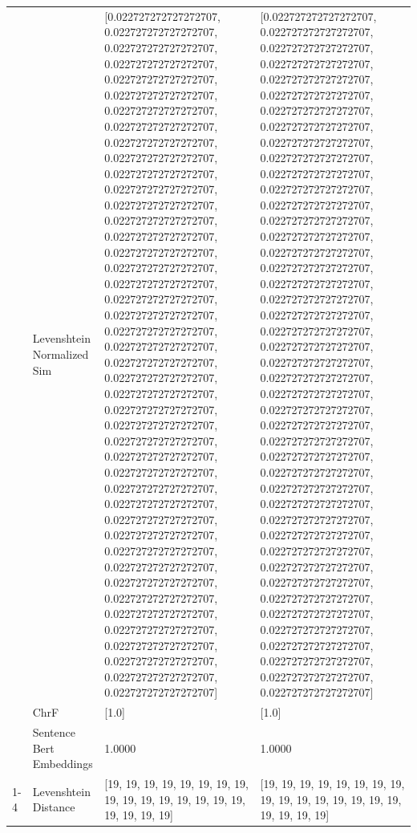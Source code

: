 \begin{tabular}{llll}
 & Levenshtein Normalized Sim & [0.022727272727272707, 0.022727272727272707, 0.022727272727272707, 0.022727272727272707, 0.022727272727272707, 0.022727272727272707, 0.022727272727272707, 0.022727272727272707, 0.022727272727272707, 0.022727272727272707, 0.022727272727272707, 0.022727272727272707, 0.022727272727272707, 0.022727272727272707, 0.022727272727272707, 0.022727272727272707, 0.022727272727272707, 0.022727272727272707, 0.022727272727272707, 0.022727272727272707, 0.022727272727272707, 0.022727272727272707, 0.022727272727272707, 0.022727272727272707, 0.022727272727272707, 0.022727272727272707, 0.022727272727272707, 0.022727272727272707, 0.022727272727272707, 0.022727272727272707, 0.022727272727272707, 0.022727272727272707, 0.022727272727272707, 0.022727272727272707, 0.022727272727272707, 0.022727272727272707, 0.022727272727272707, 0.022727272727272707, 0.022727272727272707, 0.022727272727272707, 0.022727272727272707, 0.022727272727272707, 0.022727272727272707, 0.022727272727272707] & [0.022727272727272707, 0.022727272727272707, 0.022727272727272707, 0.022727272727272707, 0.022727272727272707, 0.022727272727272707, 0.022727272727272707, 0.022727272727272707, 0.022727272727272707, 0.022727272727272707, 0.022727272727272707, 0.022727272727272707, 0.022727272727272707, 0.022727272727272707, 0.022727272727272707, 0.022727272727272707, 0.022727272727272707, 0.022727272727272707, 0.022727272727272707, 0.022727272727272707, 0.022727272727272707, 0.022727272727272707, 0.022727272727272707, 0.022727272727272707, 0.022727272727272707, 0.022727272727272707, 0.022727272727272707, 0.022727272727272707, 0.022727272727272707, 0.022727272727272707, 0.022727272727272707, 0.022727272727272707, 0.022727272727272707, 0.022727272727272707, 0.022727272727272707, 0.022727272727272707, 0.022727272727272707, 0.022727272727272707, 0.022727272727272707, 0.022727272727272707, 0.022727272727272707, 0.022727272727272707, 0.022727272727272707, 0.022727272727272707] \\
 & ChrF & [1.0] & [1.0] \\
 & Sentence Bert Embeddings & 1.0000 & 1.0000 \\
\cline{1-4}
\multirow[t]{4}{*}{Rituko nigo rire ri’ogosesenia.} & Levenshtein Distance & [19, 19, 19, 19, 19, 19, 19, 19, 19, 19, 19, 19, 19, 19, 19, 19, 19, 19, 19, 19] & [19, 19, 19, 19, 19, 19, 19, 19, 19, 19, 19, 19, 19, 19, 19, 19, 19, 19, 19, 19] \\

\end{tabular}
